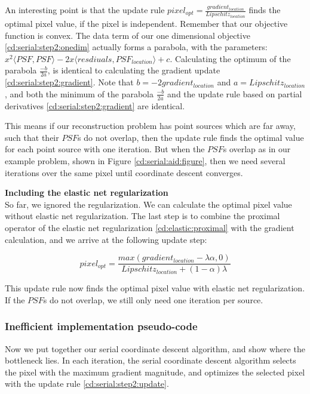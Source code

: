 An interesting point is that the update rule $pixel_{opt} = \frac{gradient_{location}}{Lipschitz_{location}}$ finds the optimal pixel value, if the pixel is independent. Remember that our objective function is convex. The data term of our one dimensional objective \eqref{cd:serial:step2:onedim} actually forms a parabola, with the parameters: $x^2 \langle PSF, PSF \rangle - 2x \langle resdiuals, PSF_{location}\rangle + c$. Calculating the optimum of the parabola $\frac{-b}{2a}$, is identical to calculating the gradient update \eqref{cd:serial:step2:gradient}. Note that $b = -2 gradient_{location}$ and $a = Lipschitz_{location}$, and both the minimum of the parabola $\frac{-b}{2a}$ and the update rule based on partial derivatives \eqref{cd:serial:step2:gradient} are identical.

This means if our reconstruction problem has point sources which are far away, such that their $PSF$s do not overlap, then the update rule finds the optimal value for each point source with one iteration. But when the $PSF$s overlap as in our example problem, shown in Figure \ref{cd:serial:aid:figure}, then we need several iterations over the same pixel until coordinate descent converges.

\textbf{Including the elastic net regularization}\\
So far, we ignored the regularization. We can calculate the optimal pixel value without elastic net regularization. The last step is to combine the proximal operator of the elastic net regularization \eqref{cd:elastic:proximal} with the gradient calculation, and we arrive at the following update step:

\begin{equation} \label{cd:serial:step2:update}
pixel_{opt} = \frac{max(gradient_{location} - \lambda\alpha, 0)}{Lipschitz_{location} + (1 - \alpha)\lambda}
\end{equation}

This update rule now finds the optimal pixel value with elastic net regularization. If the $PSF$s do not overlap, we still only need one iteration per source.



\subsubsection{Inefficient implementation pseudo-code}
Now we put together our serial coordinate descent algorithm, and show where the bottleneck lies. In each iteration, the serial coordinate descent algorithm selects the pixel with the maximum gradient magnitude, and optimizes the selected pixel with the update rule \eqref{cd:serial:step2:update}.

